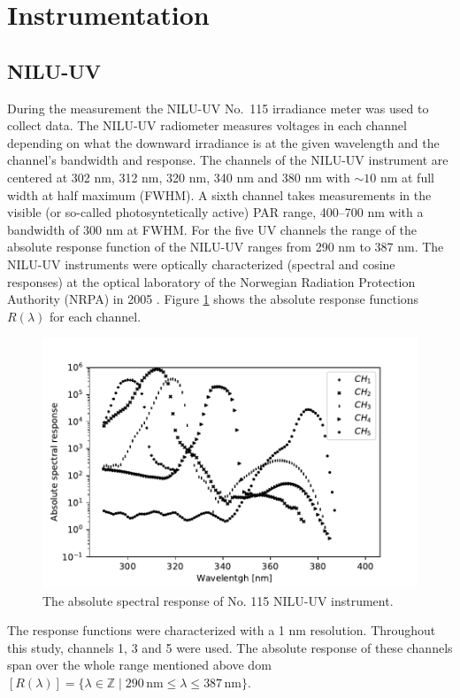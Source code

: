 \documentclass{optica-article}
\begin{document}
\section{Instrumentation}
\label{sec-instruments}

\subsection{NILU-UV}
\label{sec-niluv}

During the measurement the NILU-UV No.~115 irradiance meter was used to collect data.
The NILU-UV radiometer measures voltages in each channel depending on what the downward irradiance is at the given wavelength and the channel's bandwidth and response. 
The channels of the NILU-UV instrument are centered at 302 nm, 312 nm, 320 nm, 340 nm and 380 nm with $\sim 10$ nm at full width at half maximum (FWHM). 
A sixth channel takes measurements in the visible (or so-called photosyntetically active) PAR range, 400--700 nm with a bandwidth of 300 nm at FWHM.
For the five UV channels the range of the absolute response function of the NILU-UV ranges from 290 nm to 387 nm.
The NILU-UV instruments were optically characterized (spectral and cosine responses) at the optical laboratory of the Norwegian Radiation Protection Authority (NRPA) in 2005 \cite{Aalerud:2006}.
Figure \ref{fig:absoluteresponse} shows the absolute response functions $R(\lambda)$ for each channel. 

\begin{figure}[H]
	\centering
	\includegraphics[width=0.7\linewidth]{absolute_response}
	\caption{The absolute spectral response of No. 115 NILU-UV instrument.}
	\label{fig:absoluteresponse}
\end{figure}



The response functions were characterized with a 1 nm resolution.
Throughout this study, channels 1, 3 and 5 were used. 
The absolute response of these channels span over the whole range mentioned above dom$[R(\lambda)] = \{\lambda \in \mathbb{Z} \mid 290 \, \text{nm} \leq \lambda \leq 387 \, \text{nm} \}$.
\end{document}

